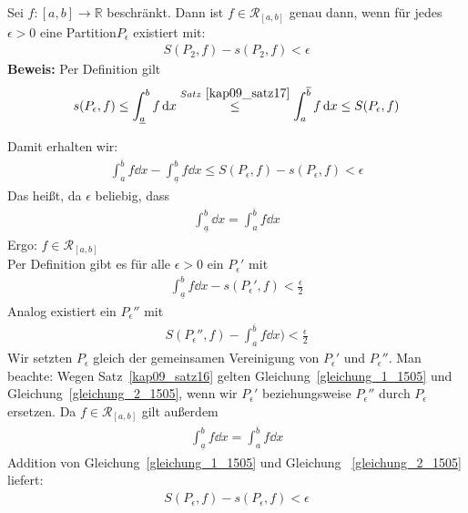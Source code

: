 
\begin{Satz}{\label{kap_10_satz18}
	Sei $f: [a,b] \rightarrow \mathbb{R}$ beschränkt. Dann ist 
	$f \in \mathcal{R}_{[a,b]}$ genau dann, wenn für jedes $\epsilon > 0$ eine 
	Partition$P_{\epsilon}$ existiert mit:
	\begin{align*}
		S(P_2,f) - s(P_2,f) < \epsilon
	\end{align*}
	\textbf{Beweis:} Per Definition gilt 
	\begin{align*}
		s(P_{\epsilon},f) \leq \int_{\underline{a}}^b f \dd{x}
		\overset{Satz~\ref{kap09_satz17}}{\le} \int_a^{\overline{b}} f \dd{x} 
		\leq S(P_{\epsilon},f) 		
	\end{align*}

	Damit erhalten wir:
	\begin{align*}
		\int_a^{\overline{b}} f \dd{x} - 
		\int_{\underline{a}}^b f \dd{x} \leq S(P_{\epsilon},f) 
		- s(P_{\epsilon},f) < \epsilon
	\end{align*}
	Das heißt, da $\epsilon$ beliebig, dass
	\begin{align*}
		\int_{\underline{a}}^b \dd{x} = \int_a^{\overline{b}} f \dd{x}
	\end{align*}
	Ergo: $f \in \mathcal{R}_{[a,b]}$ \\
	Per Definition gibt es für alle $\epsilon > 0$ ein $P_{\epsilon}'$ mit 
	\begin{align}
		\label{gleichung_1_1505}
		\int_{\underline{a}}^b f \dd{x} - s(P_{\epsilon}',f) < \frac{\epsilon}{2} 
	\end{align}
	Analog existiert ein $P_{\epsilon}''$ mit 
	\begin{align}
		\label{gleichung_2_1505}
		S(P_{\epsilon}'',f) - \int_a^{\overline{b}} f \dd{x}) < \frac{\epsilon}{2}
	\end{align}
	Wir setzten $P_{\epsilon}$ gleich der gemeinsamen Vereinigung von 
	$P_{\epsilon}'$ und $P_{\epsilon}''$. Man beachte: Wegen Satz~\ref{kap09_satz16} 
	gelten Gleichung~\ref{gleichung_1_1505} und Gleichung~\ref{gleichung_2_1505},
	wenn wir $P_{\epsilon}'$ beziehungsweise $P_{\epsilon}''$ durch $P_{\epsilon}$
	ersetzen. Da $f \in \mathcal{R}_{[a,b]}$ gilt außerdem 
	\begin{align*}
		\int_{\underline{a}}^b f \dd{x} = \int_a^{\overline{b}} f\dd{x}
	\end{align*}	 
	Addition von Gleichung~\ref{gleichung_1_1505} und Gleichung~
	\ref{gleichung_2_1505} liefert:
	\begin{align*}
	S(P_{\epsilon},f) - s(P_{\epsilon},f) < \epsilon
	\end{align*}
}\end{Satz}

